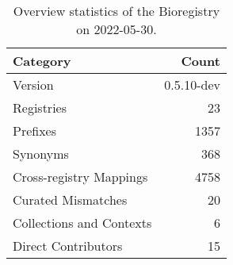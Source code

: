 \begin{table}
\centering
\caption{Overview statistics of the Bioregistry on 2022-05-30.}
\label{tab:bioregistry-summary}
\begin{tabular}{lr}
\toprule
                Category &      Count \\
\midrule
                 Version & 0.5.10-dev \\
              Registries &         23 \\
                Prefixes &       1357 \\
                Synonyms &        368 \\
 Cross-registry Mappings &       4758 \\
      Curated Mismatches &         20 \\
Collections and Contexts &          6 \\
     Direct Contributors &         15 \\
\bottomrule
\end{tabular}
\end{table}
